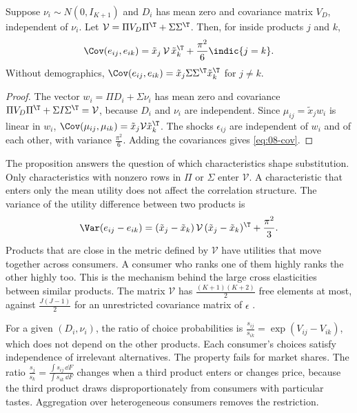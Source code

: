 \begin{proposition}\label{prop:08-cov}
Suppose $\nu_i \sim N(0, I_{K+1})$ and $D_i$ has mean zero and covariance matrix $V_D$, independent of $\nu_i$.
Let $\mathcal{V} = \Pi V_D \Pi^\T + \Sigma\Sigma^\T$. Then, for inside products $j$ and $k$,
\begin{equation}\label{eq:08-cov}
  \Cov(e_{ij}, e_{ik}) = \tilde x_j\, \mathcal{V}\, \tilde x_k^\T + \frac{\pi^2}{6}\indic\{j = k\}.
\end{equation}
Without demographics, $\Cov(e_{ij}, e_{ik}) = \tilde x_j \Sigma\Sigma^\T \tilde x_k^\T$ for $j \ne k$.
\end{proposition}

\begin{proof}
The vector $w_i = \Pi D_i + \Sigma\nu_i$ has mean zero and covariance $\Pi V_D \Pi^\T + \Sigma I \Sigma^\T =
\mathcal{V}$, because $D_i$ and $\nu_i$ are independent. Since $\mu_{ij} = \tilde x_j w_i$ is linear in $w_i$,
$\Cov(\mu_{ij}, \mu_{ik}) = \tilde x_j\mathcal{V}\tilde x_k^\T$. The shocks $\epsilon_{ij}$ are independent of
$w_i$ and of each other, with variance $\frac{\pi^2}{6}$. Adding the covariances gives \eqref{eq:08-cov}.
\end{proof}

The proposition answers the question of which characteristics shape substitution. Only characteristics with
nonzero rows in $\Pi$ or $\Sigma$ enter $\mathcal{V}$. A characteristic that enters only the mean utility does not
affect the correlation structure. The variance of the utility difference between two products is
\begin{equation}\label{eq:08-utility-difference}
  \Var(e_{ij} - e_{ik}) = (\tilde x_j - \tilde x_k)\, \mathcal{V}\, (\tilde x_j - \tilde x_k)^\T + \frac{\pi^2}{3}.
\end{equation}
Products that are close in the metric defined by $\mathcal{V}$ have utilities that move together across
consumers. A consumer who ranks one of them highly ranks the other highly too. This is the mechanism behind the
large cross elasticities between similar products. The matrix $\mathcal{V}$ has $\frac{(K+1)(K+2)}{2}$ free
elements at most, against $\frac{J(J-1)}{2}$ for an unrestricted covariance matrix of $\epsilon$
\citep[p.~525]{Nevo2000a}.

\begin{remark}\label{rem:08-iia}
For a given $(D_i, \nu_i)$, the ratio of choice probabilities is $\frac{s_{ij}}{s_{ik}} = \exp(V_{ij} -
V_{ik})$, which does not depend on the other products. Each consumer's choices satisfy independence of
irrelevant alternatives. The property fails for market shares. The ratio $\frac{s_j}{s_k} = \frac{\int s_{ij}\,
\dd F}{\int s_{ik}\, \dd F}$ changes when a third product enters or changes price, because the third product
draws disproportionately from consumers with particular tastes. Aggregation over heterogeneous consumers
removes the restriction.
\end{remark}

